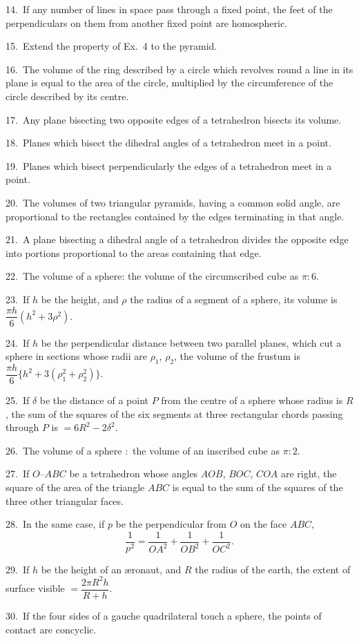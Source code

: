 \documentclass[oneside]{book}
\begin{document}
\begin{footnotesize}
14.~If any number of lines in space pass through a fixed point,
the feet of the perpendiculars on them from another fixed point
are homospheric.

15.~Extend the property of Ex.~4 to the pyramid.

16.~The volume of the ring described by a circle which revolves
round a line in its plane is equal to the area of the circle, multiplied
by the circumference of the circle described by its centre.

17.~Any plane bisecting two opposite edges of a tetrahedron
bisects its volume.

18.~Planes which bisect the dihedral angles of a tetrahedron
meet in a point.

19.~Planes which bisect perpendicularly the edges of a
tetrahedron meet in a point.

20.~The volumes of two triangular pyramids, having a common
solid angle, are proportional to the rectangles contained by the
edges terminating in that angle.

21.~A plane bisecting a dihedral angle of a tetrahedron divides
the opposite edge into portions proportional to the areas containing
that edge.

22.~The volume of a sphere: the volume of the circumscribed
cube as $\pi : 6$.

23.~If $h$ be the height, and $\rho$ the radius of a segment of a
sphere, its volume is $\dfrac{\pi h}{6} (h^2 + 3 \rho^2)$.

24.~If $h$ be the perpendicular distance between two parallel
planes, which cut a sphere in sections whose radii are $\rho_1$, $\rho_2$, the
volume of the frustum is $\dfrac{\pi h}{6} \{h^2 + 3(\rho_1^2 + \rho_2^2)\}$.

25.~If $\delta$ be the distance of a point $P$ from the centre of a sphere
whose radius is $R$, the sum of the squares of the six segments at
three rectangular chords passing through $P$ is $= 6R^2 - 2\delta^2$.

26.~The volume of a sphere $:$ the volume of an inscribed cube
as $\pi : 2$.

27.~If $O$--$ABC$ be a tetrahedron whose angles $AOB$, $BOC$,
$COA$ are right, the square of the area of the triangle $ABC$ is equal
to the sum of the squares of the three other triangular faces.

28.~In the same case, if $p$ be the perpendicular from $O$ on the
face $ABC$,
\begin{equation*}
\frac{1} {p^2} = \frac{1} {OA^2} + \frac{1} {OB^2} + \frac{1} {OC^2}.
\end{equation*}

29.~If $h$ be the height of an {\ae}ronaut, and $R$ the radius of the
earth, the extent of surface visible $= \dfrac{2\pi R^2 h} {R + h}$.

30.~If the four sides of a gauche quadrilateral touch a sphere,
the points of contact are concyclic.
\par\end{footnotesize}
\end{document}
